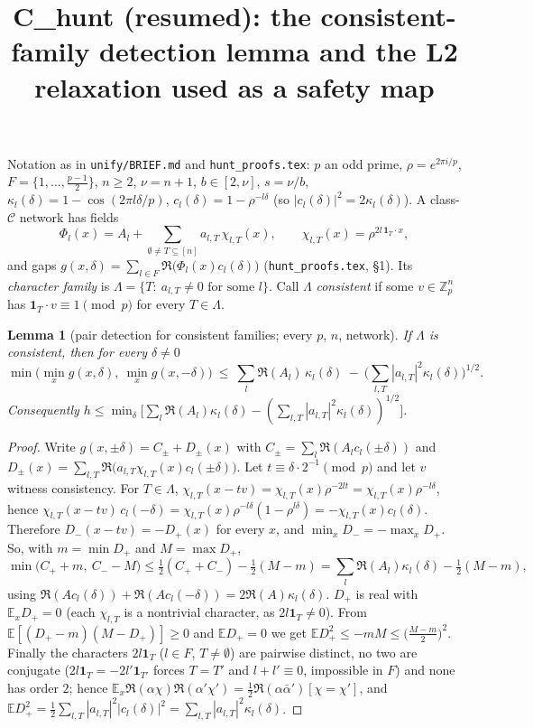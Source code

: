 \documentclass[11pt]{article}
\title{C\_hunt (resumed): the consistent-family detection lemma and the L2 relaxation used as a safety map}
\date{}
\newtheorem{lemma}[theorem]{Lemma}
\theoremstyle{remark}
\begin{document}
\maketitle

\noindent Notation as in \texttt{unify/BRIEF.md} and \texttt{hunt\_proofs.tex}: $p$ an odd prime, $\rho=e^{2\pi i/p}$, $F=\{1,\dots,\frac{p-1}2\}$,
$n\ge2$, $\nu=n+1$, $b\in[2,\nu]$, $s=\nu/b$, $\kappa_l(\delta)=1-\cos(2\pi l\delta/p)$, $c_l(\delta)=1-\rho^{-l\delta}$ (so $|c_l(\delta)|^2=2\kappa_l(\delta)$).
A class-$\mathcal C$ network has fields
\[
\Phi_l(x)=A_l+\sum_{\emptyset\neq T\subseteq[n]}a_{l,T}\,\chi_{l,T}(x),\qquad \chi_{l,T}(x)=\rho^{2l\,\mathbf 1_T\cdot x},
\]
and gaps $g(x,\delta)=\sum_{l\in F}\Re\big(\Phi_l(x)c_l(\delta)\big)$ (\texttt{hunt\_proofs.tex}, \S1).  Its \emph{character family} is
$\Lambda=\{T:\ a_{l,T}\ne0\text{ for some }l\}$.  Call $\Lambda$ \emph{consistent} if some $v\in\mathbb Z_p^n$ has $\mathbf 1_T\cdot v\equiv1\pmod p$ for every $T\in\Lambda$.

\begin{lemma}[pair detection for consistent families; every $p$, $n$, network]\label{lem:L2}
If $\Lambda$ is consistent, then for every $\delta\ne0$
\[
\min\Big(\min_xg(x,\delta),\ \min_xg(x,-\delta)\Big)\ \le\ \sum_l\Re(A_l)\,\kappa_l(\delta)\ -\ \Big(\sum_{l,T}|a_{l,T}|^2\kappa_l(\delta)\Big)^{1/2}.
\]
Consequently $h\le\min_\delta\big[\sum_l\Re(A_l)\kappa_l(\delta)-(\sum_{l,T}|a_{l,T}|^2\kappa_l(\delta))^{1/2}\big]$.
\end{lemma}
\begin{proof}
Write $g(x,\pm\delta)=C_{\pm}+D_{\pm}(x)$ with $C_\pm=\sum_l\Re(A_lc_l(\pm\delta))$ and $D_\pm(x)=\sum_{l,T}\Re\big(a_{l,T}\chi_{l,T}(x)c_l(\pm\delta)\big)$.
Let $t\equiv\delta\cdot2^{-1}\pmod p$ and let $v$ witness consistency.  For $T\in\Lambda$,
$\chi_{l,T}(x-tv)=\chi_{l,T}(x)\rho^{-2lt}=\chi_{l,T}(x)\rho^{-l\delta}$, hence
$\chi_{l,T}(x-tv)\,c_l(-\delta)=\chi_{l,T}(x)\rho^{-l\delta}(1-\rho^{l\delta})=-\chi_{l,T}(x)c_l(\delta)$.  Therefore $D_-(x-tv)=-D_+(x)$ for every $x$, and
$\min_xD_-=-\max_xD_+$.  So, with $m=\min D_+$ and $M=\max D_+$,
\[
\min\big(C_++m,\ C_--M\big)\le\tfrac12(C_++C_-)-\tfrac12(M-m)=\sum_l\Re(A_l)\kappa_l(\delta)-\tfrac12(M-m),
\]
using $\Re(Ac_l(\delta))+\Re(Ac_l(-\delta))=2\Re(A)\kappa_l(\delta)$.
$D_+$ is real with $\mathbb E_xD_+=0$ (each $\chi_{l,T}$ is a nontrivial character, as $2l\mathbf 1_T\neq0$).  From $\mathbb E[(D_+-m)(M-D_+)]\ge0$ and
$\mathbb ED_+=0$ we get $\mathbb ED_+^2\le-mM\le\big(\frac{M-m}2\big)^2$.  Finally the characters $2l\mathbf 1_T$ ($l\in F$, $T\ne\emptyset$) are pairwise
distinct, no two are conjugate ($2l\mathbf 1_T=-2l'\mathbf 1_{T'}$ forces $T=T'$ and $l+l'\equiv0$, impossible in $F$) and none has order $2$;
hence $\mathbb E_x\Re(\alpha\chi)\Re(\alpha'\chi')=\frac12\Re(\alpha\bar\alpha')[\chi=\chi']$, and
$\mathbb ED_+^2=\frac12\sum_{l,T}|a_{l,T}|^2|c_l(\delta)|^2=\sum_{l,T}|a_{l,T}|^2\kappa_l(\delta)$.
\end{proof}
\end{document}
